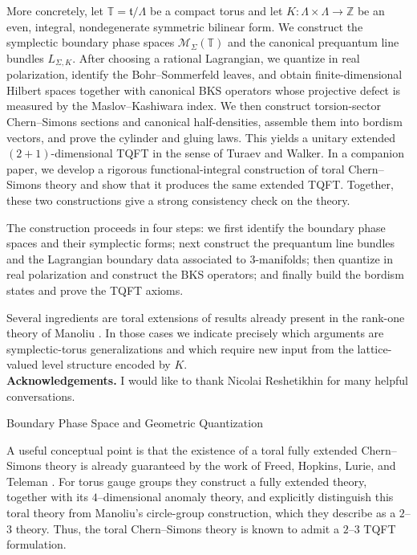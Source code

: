 \documentclass[12pt]{amsart}
\makeatletter
\renewcommand\section{\@startsection{section}{1}%
  \z@{.7\linespacing\@plus\linespacing}{.5\linespacing}%
  {\normalfont\bfseries\centering}}
\numberwithin{equation}{section}
\makeatother
\begin{document}
More concretely, let \(\mathbb T=\mathfrak t/\Lambda\) be a compact torus and let
\(K:\Lambda\times\Lambda\to\mathbb Z\) be an even, integral, nondegenerate symmetric
bilinear form. We construct the symplectic boundary phase spaces
\(\mathcal M_\Sigma(\mathbb T)\) and the canonical prequantum line bundles
\(L_{\Sigma,K}\). After choosing a rational Lagrangian, we quantize in real polarization,
identify the Bohr--Sommerfeld leaves, and obtain finite-dimensional Hilbert spaces
together with canonical BKS operators whose projective defect is measured by the
Maslov--Kashiwara index. We then construct torsion-sector Chern--Simons sections and
canonical half-densities, assemble them into bordism vectors, and prove the cylinder and
gluing laws. This yields a unitary extended \((2+1)\)-dimensional TQFT in the sense of Turaev and Walker. In a companion paper, we develop a rigorous functional-integral construction of toral Chern–Simons theory \cite{Galviz3.5} and show that it produces the same extended TQFT. Together, these two constructions give a strong consistency check on the theory.

The construction proceeds in four steps: we first identify the boundary phase spaces and
their symplectic forms; next construct the prequantum line bundles and the Lagrangian
boundary data associated to \(3\)-manifolds; then quantize in real polarization and
construct the BKS operators; and finally build the bordism states and prove the TQFT
axioms.

Several ingredients are toral extensions of results already present in the rank-one
theory of Manoliu \cite{Manoliu1,Manoliu2}. In those cases we indicate precisely which
arguments are symplectic-torus generalizations and which require new input from the
lattice-valued level structure encoded by \(K\).\\

\textbf{Acknowledgements.} I would like to thank Nicolai Reshetikhin for many helpful
conversations.

\section{\texorpdfstring{Boundary Phase Space and Geometric Quantization}{Boundary Phase Space and Geometric Quantization}}
\label{sec:Toral-TQFT}

A useful conceptual point is that the existence  of a toral fully extended Chern--Simons theory is already guaranteed by the work of Freed, Hopkins, Lurie, and Teleman \cite{FreedHopkinsLurieTeleman}. For torus gauge groups they construct a fully extended theory, together with its $4$--dimensional anomaly theory, and explicitly distinguish this toral theory from Manoliu's circle-group construction, which they describe as a $2$--$3$ theory. Thus, the toral Chern--Simons theory is known to admit a $2$--$3$ TQFT formulation.
\end{document}
